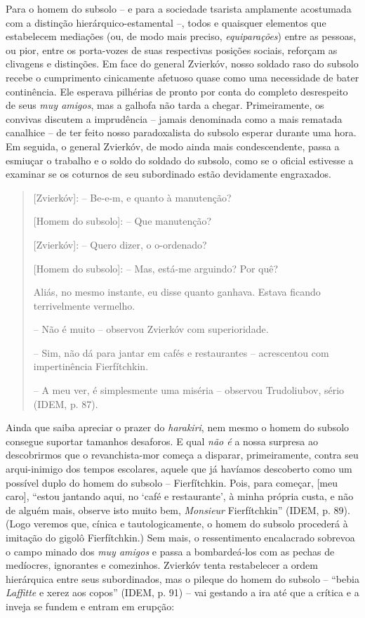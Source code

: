 Para o homem do subsolo -- e para a sociedade tsarista amplamente
acostumada com a distinção hierárquico-estamental --, todos e quaisquer
elementos que estabelecem mediações (ou, de modo mais preciso,
\emph{equiparações}) entre as pessoas, ou pior, entre os porta-vozes de
suas respectivas posições sociais, reforçam as clivagens e distinções.
Em face do general Zvierkóv, nosso soldado raso do subsolo recebe o
cumprimento cinicamente afetuoso quase como uma necessidade de bater
continência. Ele esperava pilhérias de pronto por conta do completo
desrespeito de seus \emph{muy amigos}, mas a galhofa não tarda a chegar.
Primeiramente, os convivas discutem a imprudência -- jamais denominada
como a mais rematada canalhice -- de ter feito nosso paradoxalista do
subsolo esperar durante uma hora. Em seguida, o general Zvierkóv, de
modo ainda mais condescendente, passa a esmiuçar o trabalho e o soldo do
soldado do subsolo, como se o oficial estivesse a examinar se os
coturnos de seu subordinado estão devidamente engraxados.

\begin{quote}
{[}Zvierkóv{]}: -- Be-e-m, e quanto à manutenção?

{[}Homem do subsolo{]}: -- Que manutenção?

{[}Zvierkóv{]}: -- Quero dizer, o o-ordenado?

{[}Homem do subsolo{]}: -- Mas, está-me arguindo? Por quê?

Aliás, no mesmo instante, eu disse quanto ganhava. Estava ficando
terrivelmente vermelho.

-- Não é muito -- observou Zvierkóv com superioridade.

-- Sim, não dá para jantar em cafés e restaurantes -- acrescentou com
impertinência Fierfítchkin.

-- A meu ver, é simplesmente uma miséria -- observou Trudoliubov, sério
(IDEM, p. 87).
\end{quote}

Ainda que saiba apreciar o prazer do \emph{harakiri}, nem mesmo o homem
do subsolo consegue suportar tamanhos desaforos. E qual \emph{não é} a
nossa surpresa ao descobrirmos que o revanchista-mor começa a disparar,
primeiramente, contra seu arqui-inimigo dos tempos escolares, aquele que
já havíamos descoberto como um possível duplo do homem do subsolo --
Fierfítchkin. Pois, para começar, {[}meu caro{]}, ``estou jantando aqui,
no `café e restaurante', à minha própria custa, e não de alguém mais,
observe isto muito bem, \emph{Monsieur} Fierfítchkin'' (IDEM, p. 89).
(Logo veremos que, cínica e tautologicamente, o homem do subsolo
procederá à imitação do gigolô Fierfítchkin.) Sem mais, o ressentimento
encalacrado sobrevoa o campo minado dos \emph{muy amigos} e passa a
bombardeá-los com as pechas de medíocres, ignorantes e comezinhos.
Zvierkóv tenta restabelecer a ordem hierárquica entre seus subordinados,
mas o pileque do homem do subsolo -- ``bebia \emph{Laffitte} e xerez aos
copos'' (IDEM, p. 91) -- vai gestando a ira até que a crítica e a inveja
se fundem e entram em erupção:

